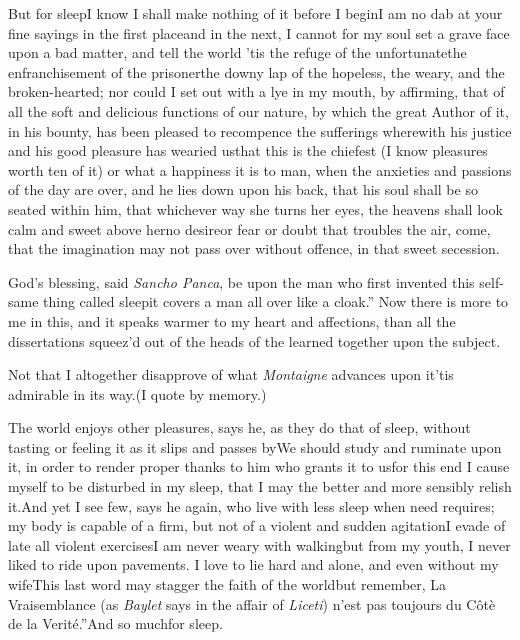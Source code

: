 \documentclass{article}
\begin{document}
But for sleep\tsk I know I shall make nothing of it before I begin\tsk I am no dab at
your fine sayings in the first place\break\tsk and in the
next, I cannot for my soul
set a grave face upon a bad matter, and tell the world\tsk
’tis the refuge of the unfortunate\tsk the enfranchisement
of the prisoner\tsk the downy lap of the hopeless, the
weary, and the broken-hearted; nor could I set out with a
lye in my mouth, by affirming, that of all the soft and
delicious functions of our nature, by which the great Author
of it, in his bounty, has been pleased to recompence the
sufferings wherewith his justice and his good pleasure has
wearied us\tsh that this is the chiefest (I know pleasures
worth ten of it) or what a happiness it is to man, when the
anxieties and passions of the day are over, and he lies down
upon his back, that his soul shall be so seated within him,
that whichever way she turns her eyes, the heavens shall
look calm and sweet above her\tsk no desire\tsk or fear\tsk
or doubt that troubles the air,
 come, that the imagination may not pass over
without offence, in that sweet secession.

\tsk\lqq God’s blessing, said \textit{Sancho Panca},\break
\lqq be upon the man who first invented\break
\lqq this self-same thing called sleep\tsk it\break
\lqq covers a man all over like a cloak.”\break
Now there is more to me in this, and it speaks warmer to my
heart and affections, than all the dissertations squeez’d out
of the heads of the learned together upon the subject.

\tsk Not that I altogether disapprove of what \textit{Montaigne} advances upon
it\tsk ’tis admirable in its way.\tsk (I quote by
memory.)

The world enjoys other pleasures, says he, as they do that of
sleep, without tasting or feeling it as it slips and passes
by\tsk We should study and ruminate upon it, in order to render
proper thanks to him who grants it to us\tsk for this end I
cause myself to be disturbed in my sleep, that I may the better and
more sensibly relish it.\tsk And yet I see few, says he
again, who live with less sleep when need requires; my body is
capable of a firm, but not of a violent and sudden
agitation\tsk I evade of late all violent
exercises\tsk I am never weary with
walking\tsk but from my youth, I never liked to ride upon
pavements. I love to lie hard and alone, and even without my
wife\tsk This last word may stagger the faith of the
world\tsk but remember, \lqq La\break
\lqq Vraisemblance (as \textit{Baylet} says in the\break
\lqq affair of \textit{Liceti}) n’est pas toujours
\lqq du Côtè de la Verité.”\quad And so much\break for sleep.
\end{document}
